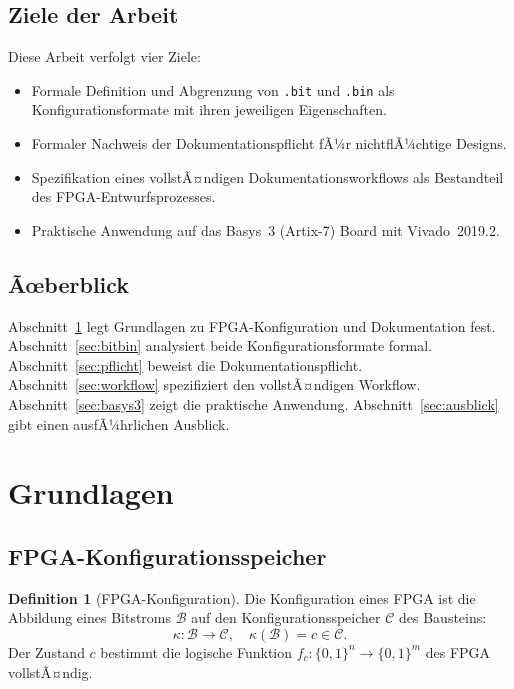 ﻿\documentclass[a4paper,12pt]{article}
\theoremstyle{definition}
\newtheorem{definition}{Definition}
\begin{document}
\subsection{Ziele der Arbeit}

Diese Arbeit verfolgt vier Ziele:
\begin{itemize}
    \item Formale Definition und Abgrenzung von \texttt{.bit} und \texttt{.bin}
          als Konfigurationsformate mit ihren jeweiligen Eigenschaften.
    \item Formaler Nachweis der Dokumentationspflicht fÃ¼r nichtflÃ¼chtige Designs.
    \item Spezifikation eines vollstÃ¤ndigen Dokumentationsworkflows als
          Bestandteil des FPGA-Entwurfsprozesses.
    \item Praktische Anwendung auf das Basys~3 (Artix-7) Board mit Vivado~2019.2.
\end{itemize}

\subsection{Ãœberblick}

Abschnitt~\ref{sec:grundlagen} legt Grundlagen zu FPGA-Konfiguration und
Dokumentation fest. Abschnitt~\ref{sec:bitbin} analysiert beide
Konfigurationsformate formal. Abschnitt~\ref{sec:pflicht} beweist die
Dokumentationspflicht. Abschnitt~\ref{sec:workflow} spezifiziert den
vollstÃ¤ndigen Workflow. Abschnitt~\ref{sec:basys3} zeigt die praktische
Anwendung. Abschnitt~\ref{sec:ausblick} gibt einen ausfÃ¼hrlichen Ausblick.

\section{Grundlagen}
\label{sec:grundlagen}

\subsection{FPGA-Konfigurationsspeicher}

\begin{definition}[FPGA-Konfiguration]
    Die Konfiguration eines FPGA ist die Abbildung eines Bitstroms $\mathcal{B}$
    auf den Konfigurationsspeicher $\mathcal{C}$ des Bausteins:
    \[
    \kappa: \mathcal{B} \to \mathcal{C}, \quad \kappa(\mathcal{B}) = c \in \mathcal{C}.
    \]
    Der Zustand $c$ bestimmt die logische Funktion $f_c: \{0,1\}^n \to \{0,1\}^m$
    des FPGA vollstÃ¤ndig.
\end{definition}
\end{document}
